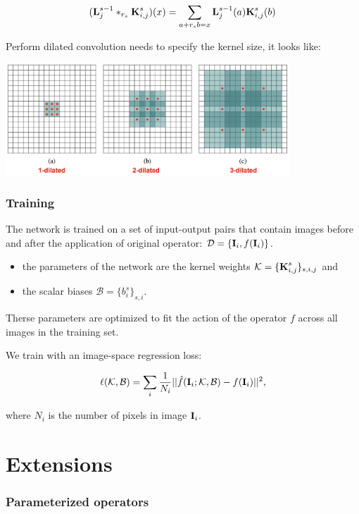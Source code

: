 \documentclass{article}
\newcommand{\tb}{\textbf}
\begin{document}
$$(\textbf L_j^{s - 1} *_{r_s} \textbf K_{i,j}^s) (x) = \sum\limits_{a + r_s b = x} \textbf L_j^{s - 1}(a) \textbf K_{i,j}^s(b)$$

Perform dilated convolution needs to specify the kernel size, it looks like: \\

\begin{center}
\includegraphics[width=0.8\textwidth]{img/dilated.png}
\end{center}

\subsubsection*{Training}

The network is trained on a set of input-output pairs that contain images before and after the application of original operator: $\mathcal D = \{\tb I_i, f(\tb I_i)\}$.

\begin{itemize}
    \item the parameters of the network are the kernel weights $\mathcal K = \{\tb K_{i, j}^s\}_{s, i, j}$ and
    \item the scalar biases $\mathcal B = \{b_i^s\}_{s, i}$.
\end{itemize}

Therse parameters are optimized to fit the action of the operator $f$ across all images in the training set.

We train with an image-space regression loss:

$$\ell(\mathcal K, \mathcal B) = \sum\limits_i \frac{1}{N_i} ||\hat f(\tb I_i; \mathcal K, \mathcal B) - f(\tb I_i)||^2,$$

where $N_i$ is the number of pixels in image $\tb I_i$.

\section*{Extensions}

\subsubsection*{Parameterized operators}
\end{document}
